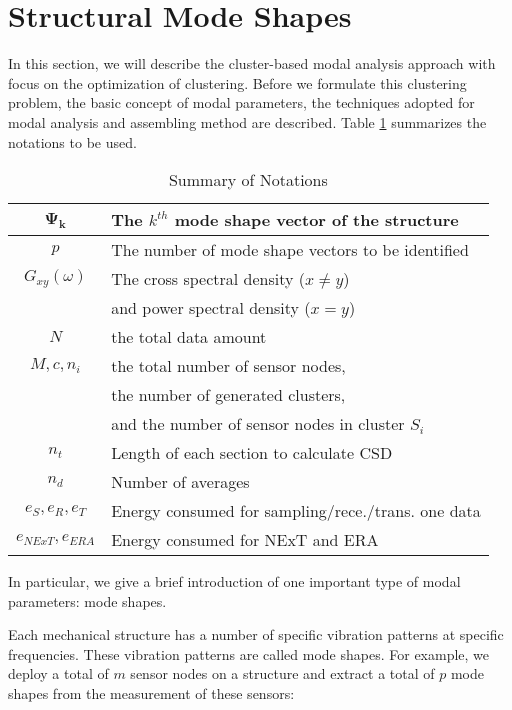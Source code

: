 \section{Structural Mode Shapes}
In this section, we will describe the cluster-based modal analysis approach with focus on the optimization of clustering. Before we formulate this clustering problem, the basic concept of modal parameters, the techniques adopted for modal analysis and assembling method are described. Table \ref{tab:Table1} summarizes the notations to be used.

\begin{table}
	\centering
\begin{tabular}{|c|l|}
\hline
\(\mathbf{\Psi_k}\)& The \(k^{th}\) mode shape vector of the structure\\
\hline
\(p\) &	The number of mode shape vectors to be identified\\
\hline
\(G_{xy}(\omega)\)& The cross spectral density (\(x\neq y\))\\
\ & and power spectral density (\(x=y\))\\
\hline
\(N\) & the total data amount\\
\hline
\(M,c,n_i\) & the total number of sensor nodes,\\ 
\ & the number of generated clusters, \\
\ & and the number of sensor nodes in cluster \(S_i\)\\
\hline
\(n_t\)	& Length of each section to calculate CSD\\
\hline
\(n_d\)	& Number of averages\\
\hline
\(e_S, e_R, e_T \)& Energy consumed for sampling/rece./trans. one data\\
\hline
\(e_{NExT}, e_{ERA}\)	& Energy consumed for NExT and ERA\\
\hline
\end{tabular}
	\caption{Summary of Notations}
	\label{tab:Table1}
\end{table}

In particular, we give a brief introduction of one important type of modal parameters: mode shapes. 

Each mechanical structure has a number of specific vibration patterns at specific frequencies. These vibration patterns are called mode shapes. For example, we deploy a total of \(m\) sensor nodes on a structure and extract a total of \(p\) mode shapes from the measurement of these sensors:

